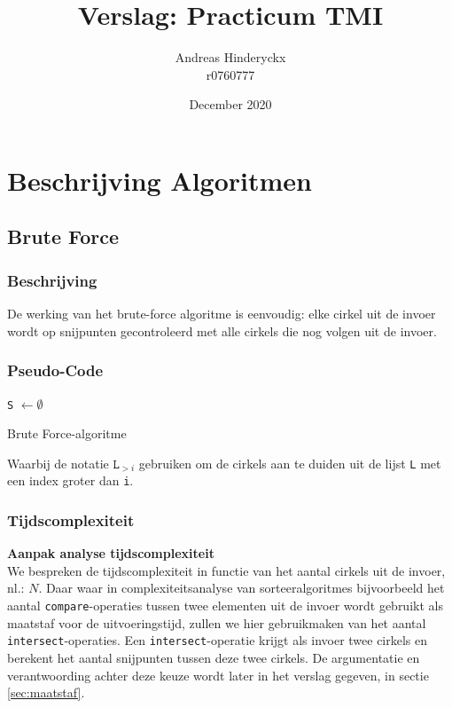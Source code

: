 \documentclass[12pt]{article}
\title{Verslag: Practicum TMI}
\author{Andreas Hinderyckx\\ r0760777}
\date{December 2020}
\begin{document}
\maketitle
\thispagestyle{empty}
\newpage

\section{Beschrijving Algoritmen}
\subsection{Brute Force}

\subsubsection{Beschrijving}
De werking van het brute-force algoritme is eenvoudig: elke cirkel uit de invoer wordt op snijpunten gecontroleerd met alle cirkels die nog volgen uit de invoer.

\subsubsection{Pseudo-Code}
\begin{algorithm}[H]
	\texttt{S} $ \leftarrow \emptyset $\\
\caption{Brute Force-algoritme}
\end{algorithm}
Waarbij de notatie $ \texttt{L}_{>i} $ gebruiken om de cirkels aan te duiden uit de lijst \texttt{L} met een index groter dan \texttt{i}.
\subsubsection{Tijdscomplexiteit}
\textbf{Aanpak analyse tijdscomplexiteit}\\
We bespreken de tijdscomplexiteit in functie van het aantal cirkels uit de invoer, nl.: $ N $. Daar waar in complexiteitsanalyse van sorteeralgoritmes bijvoorbeeld het aantal \texttt{compare}-operaties tussen twee elementen uit de invoer wordt gebruikt als maatstaf voor de uitvoeringstijd, zullen we hier gebruikmaken van het aantal \texttt{intersect}-operaties. Een \texttt{intersect}-operatie krijgt als invoer twee cirkels en berekent het aantal snijpunten tussen deze twee cirkels. De argumentatie en verantwoording achter deze keuze wordt later in het verslag gegeven, in sectie \ref{sec:maatstaf}.
\end{document}
